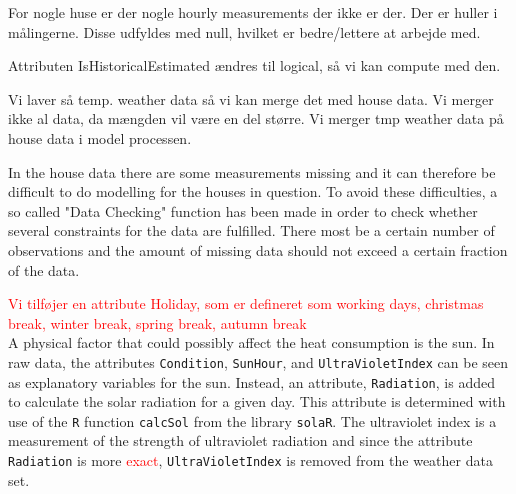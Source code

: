 For nogle huse er der nogle hourly measurements der ikke er der. Der er huller i målingerne. Disse udfyldes med null, hvilket er bedre/lettere at arbejde med. 


Attributen IsHistoricalEstimated ændres til logical, så vi kan compute med den. 

Vi laver så temp. weather data så vi kan merge det med house data. 
Vi merger ikke al data, da mængden vil være en del større. Vi merger tmp weather data på house data i model processen. 

In the house data there are some measurements missing and it can therefore be difficult to do modelling for the houses in question. To avoid these difficulties, a so called "Data Checking" function has been made in order to check whether several constraints for the data are fulfilled. There most be a certain number of observations and the amount of missing data should not exceed a certain fraction of the data. 

\noindent \textcolor{red}{Vi tilføjer en attribute Holiday, som er defineret som working days, christmas break, winter break, spring break, autumn break} \\

\noindent A physical factor that could possibly affect the heat consumption is the sun. In raw data, the attributes \texttt{Condition}, \texttt{SunHour},  and \texttt{UltraVioletIndex} can be seen as explanatory variables for the sun. Instead, an attribute, \texttt{Radiation}, is added to calculate the solar radiation for a given day. This attribute is determined with use of the \texttt{R} function \texttt{calcSol} from the library \texttt{solaR}. The ultraviolet index is a measurement of the strength of ultraviolet radiation and since the attribute \texttt{Radiation} is more \textcolor{red}{exact}, \texttt{UltraVioletIndex} is removed from the weather data set. 
